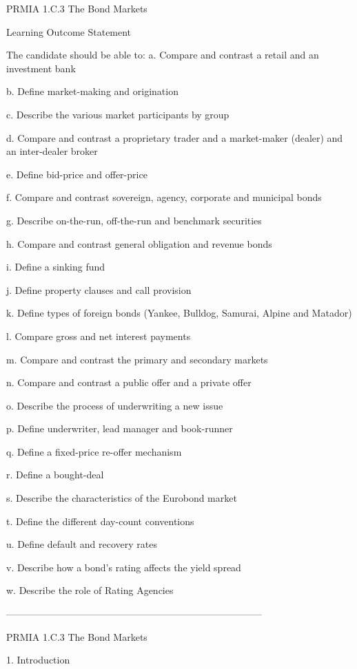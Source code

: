 
PRMIA 1.C.3 The Bond Markets

Learning Outcome Statement

The candidate should be able to:
a.
  Compare and contrast a retail and an investment bank

b.
  Define market-making and origination

c.
  Describe the various market participants by group

d.
  Compare and contrast a proprietary trader and a market-maker (dealer) and an inter-dealer broker

e.
  Define bid-price and offer-price

f.
  Compare and contrast sovereign, agency, corporate and municipal bonds

g.
  Describe on-the-run, off-the-run and benchmark securities

h.
  Compare and contrast general obligation and revenue bonds

i.
  Define a sinking fund

j.
  Define property clauses and call provision

k.
  Define types of foreign bonds (Yankee, Bulldog, Samurai, Alpine and Matador)

l.
  Compare gross and net interest payments

m.
  Compare and contrast the primary and secondary markets

n.
  Compare and contrast a public offer and a private offer

o.
  Describe the process of underwriting a new issue

p.
  Define underwriter, lead manager and book-runner

q.
  Define a fixed-price re-offer mechanism

r.
  Define a bought-deal

s.
  Describe the characteristics of the Eurobond market

t.
  Define the different day-count conventions

u.
  Define default and recovery rates

v.
  Describe how a bond’s rating affects the yield spread

w.
  Describe the role of Rating Agencies




--------------------------------------------------------------------------------


PRMIA 1.C.3 The Bond Markets

1. Introduction

